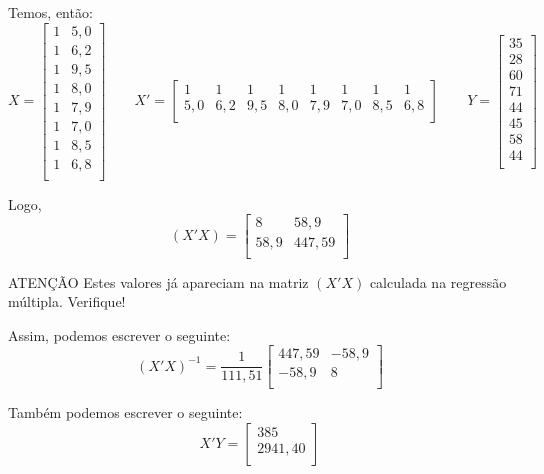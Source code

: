 \documentclass[]{ufpe-exercises}
\begin{document}
\begin{questions}
\begin{parts}
\begin{solution}
			Temos, então:
			\[
				X =
				\begin{bmatrix}
					1 & 5,0 \\
					1 & 6,2 \\
					1 & 9,5 \\
					1 & 8,0 \\
					1 & 7,9 \\
					1 & 7,0 \\
					1 & 8,5 \\
					1 & 6,8 \\
				\end{bmatrix} \qquad
				X' =
				\begin{bmatrix}
					1   & 1   & 1   & 1   & 1   & 1   & 1   & 1   \\
					5,0 & 6,2 & 9,5 & 8,0 & 7,9 & 7,0 & 8,5 & 6,8 \\
				\end{bmatrix} \qquad
				Y =
				\begin{bmatrix}
					35 \\
					28 \\
					60 \\
					71 \\
					44 \\
					45 \\
					58 \\
					44 \\
				\end{bmatrix}
			\]

			Logo,
			\[
				(X'X) =
				\begin{bmatrix}
					8    & 58,9   \\
					58,9 & 447,59 \\
				\end{bmatrix}
			\]

			\begin{myalert}{ATENÇÃO}
				Estes valores já apareciam na matriz \((X'X)\) calculada na regressão múltipla. Verifique!
			\end{myalert}

			Assim, podemos escrever o seguinte:
			\[
				(X'X)^{-1} = \frac{1}{111,51}
				\begin{bmatrix}
					447,59 & -58,9 \\
					-58,9  & 8     \\
				\end{bmatrix}
			\]

			Também podemos escrever o seguinte:
			\[
				X'Y =
				\begin{bmatrix}
					385     \\
					2941,40 \\
				\end{bmatrix}
			\]


\end{solution}
\end{parts}
\end{questions}
\end{document}
